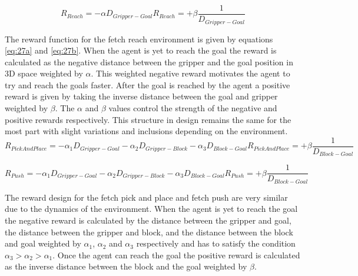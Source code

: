 \begin{subequations}
\begin{equation}\label{eq:27a}
    R_{Reach} = -\alpha D_{Gripper-Goal}
\end{equation}   
\begin{equation}\label{eq:27b}
    R_{Reach} = +\beta \frac{1}{D_{Gripper-Goal}}
\end{equation}
\end{subequations}

The reward function for the fetch reach environment is given by equations \ref{eq:27a} and \ref{eq:27b}. When the agent is yet to reach the goal the reward is calculated as the negative distance between the gripper and the goal position in 3D space weighted by $\alpha$. This weighted negative reward motivates the agent to try and reach the goals faster. After the goal is reached by the agent a positive reward is given by taking the inverse distance between the goal and gripper weighted by $\beta$. The $\alpha$ and $\beta$ values control the strength of the negative and positive rewards respectively. This structure in design remains the same for the most part with slight variations and inclusions depending on the environment. \\

\begin{subequations}
\begin{equation}\label{eq:28a}
    R_{PickAndPlace} = -\alpha_{1} D_{Gripper-Goal} -\alpha_{2} D_{Gripper-Block} -\alpha_{3} D_{Block-Goal}
\end{equation}   
\begin{equation}\label{eq:28b}
    R_{PickAndPlace} = +\beta \frac{1}{D_{Block-Goal}}
\end{equation}
\end{subequations}

\begin{subequations}
\begin{equation}\label{eq:29a}
    R_{Push} = -\alpha_{1} D_{Gripper-Goal} -\alpha_{2} D_{Gripper-Block} -\alpha_{3} D_{Block-Goal}
\end{equation}   
\begin{equation}\label{eq:29b}
    R_{Push} = +\beta \frac{1}{D_{Block-Goal}}
\end{equation}
\end{subequations}

The reward design for the fetch pick and place and fetch push are very similar due to the dynamics of the environment. When the agent is yet to reach the goal the negative reward is calculated by the distance between the gripper and goal, the distance between the gripper and block, and the distance between the block and goal weighted by $\alpha_{1}$, $\alpha_{2}$ and $\alpha_{3}$ respectively and has to satisfy the condition $\alpha_{3}>\alpha_{2}>\alpha_{1}$. Once the agent can reach the goal the positive reward is calculated as the inverse distance between the block and the goal weighted by $\beta$. \\

